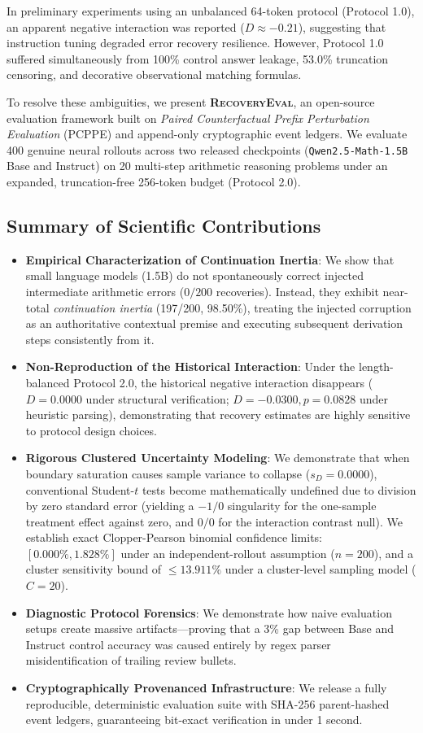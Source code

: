 \documentclass[11pt,letterpaper]{article}
\newcommand{\modelbase}{\texttt{Qwen2.5-Math-1.5B}}
\newcommand{\framework}{\textsc{RecoveryEval}}
\begin{document}
In preliminary experiments using an unbalanced 64-token protocol (Protocol 1.0), an apparent negative interaction was reported ($D \approx -0.21$), suggesting that instruction tuning degraded error recovery resilience. However, Protocol 1.0 suffered simultaneously from 100\% control answer leakage, 53.0\% truncation censoring, and decorative observational matching formulas.

To resolve these ambiguities, we present \textbf{\framework}, an open-source evaluation framework built on \textit{Paired Counterfactual Prefix Perturbation Evaluation} (PCPPE) and append-only cryptographic event ledgers. We evaluate 400 genuine neural rollouts across two released checkpoints (\modelbase{} Base and Instruct) on 20 multi-step arithmetic reasoning problems under an expanded, truncation-free 256-token budget (Protocol 2.0).

\subsection{Summary of Scientific Contributions}
\begin{itemize}[leftmargin=*]
    \item \textbf{Empirical Characterization of Continuation Inertia}: We show that small language models (1.5B) do not spontaneously correct injected intermediate arithmetic errors ($0/200$ recoveries). Instead, they exhibit near-total \textit{continuation inertia} (197/200, 98.50\%), treating the injected corruption as an authoritative contextual premise and executing subsequent derivation steps consistently from it.
    \item \textbf{Non-Reproduction of the Historical Interaction}: Under the length-balanced Protocol 2.0, the historical negative interaction disappears ($D = 0.0000$ under structural verification; $D = -0.0300, p = 0.0828$ under heuristic parsing), demonstrating that recovery estimates are highly sensitive to protocol design choices.
    \item \textbf{Rigorous Clustered Uncertainty Modeling}: We demonstrate that when boundary saturation causes sample variance to collapse ($s_D = 0.0000$), conventional Student-$t$ tests become mathematically undefined due to division by zero standard error (yielding a $-1/0$ singularity for the one-sample treatment effect against zero, and $0/0$ for the interaction contrast null). We establish exact Clopper-Pearson binomial confidence limits: $[0.000\%, 1.828\%]$ under an independent-rollout assumption ($n=200$), and a cluster sensitivity bound of $\le 13.911\%$ under a cluster-level sampling model ($C=20$).
    \item \textbf{Diagnostic Protocol Forensics}: We demonstrate how naive evaluation setups create massive artifacts---proving that a 3\% gap between Base and Instruct control accuracy was caused entirely by regex parser misidentification of trailing review bullets.
    \item \textbf{Cryptographically Provenanced Infrastructure}: We release a fully reproducible, deterministic evaluation suite with SHA-256 parent-hashed event ledgers, guaranteeing bit-exact verification in under 1 second.
\end{itemize}
\end{document}
